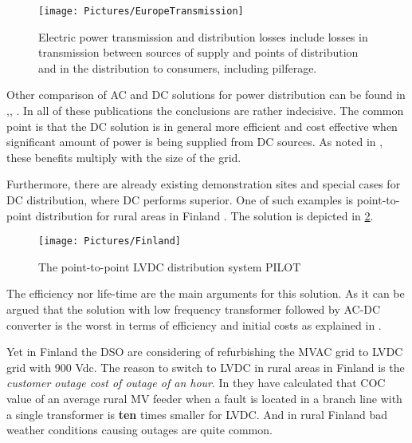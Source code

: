 \documentclass[]{scrartcl}
\begin{document}
\begin{figure}
	\centering
	\texttt{[image: Pictures/EuropeTransmission]}
	\caption{Electric power transmission and distribution losses include losses in transmission between sources of supply and points of distribution and in the distribution to consumers, including pilferage.}
	\label{fig:EuropeTransmission}
\end{figure}

Other comparison of AC and DC solutions for power distribution can be found in \cite{Starke2008},\cite{Evans2013}, \cite{Amin2011}. In all of these publications the conclusions are rather indecisive. The common point is that the DC solution is in general more efficient and cost effective when significant amount of power is being supplied from DC sources. As noted in \cite{Evans2013}, these benefits multiply with the size of the grid. 

Furthermore, there are already existing demonstration sites and special cases for DC distribution, where DC performs superior. One of such examples is point-to-point distribution for rural areas in Finland \cite{Hakala2015a}. The solution is depicted in \ref{fig:Finland}. 
 

\begin{figure}[h!]
	\centering
	\texttt{[image: Pictures/Finland]}
	\caption{The point-to-point LVDC distribution system PILOT}
	\label{fig:Finland}
\end{figure}

The efficiency nor life-time are the main arguments for this solution. As it can be argued that the solution with low frequency transformer followed by AC-DC converter is the worst in terms of efficiency and initial costs as explained in \cite{Kolar2014d}.

Yet in Finland the DSO are considering of refurbishing the MVAC grid to LVDC grid with 900 Vdc. The reason to switch to LVDC in rural areas in Finland is the \emph{customer outage cost of outage of an hour}. In \cite{Hakala2015} they have calculated that COC value of an average rural MV feeder when a fault is located in a branch line with a single transformer is \textbf{ten} times smaller for LVDC. And in rural Finland bad weather conditions causing outages are  quite common. 


\end{document}
